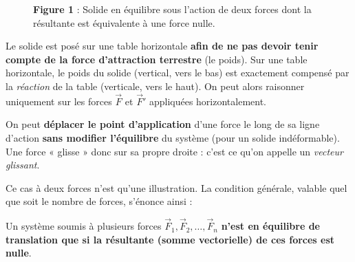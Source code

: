 \documentclass[11pt,a4paper]{article}
\newcommand{\vv}[1]{\vec{#1}}
\begin{document}
\begin{figure}[h]
\centering
{}
\caption*{\small\textbf{\textcolor{primary}{Figure 1}} : Solide en équilibre sous l'action de deux forces
dont la résultante est équivalente à une force nulle.}
\end{figure}

\begin{remarque}
Le solide est posé sur une table horizontale \textbf{afin de ne pas devoir tenir compte de la force
d'attraction terrestre} (le poids). Sur une table horizontale, le poids du solide (vertical, vers le
bas) est exactement compensé par la \emph{réaction} de la table (verticale, vers le haut). On peut
alors raisonner uniquement sur les forces $\vv F$ et $\vv F'$ appliquées horizontalement.
\end{remarque}

\begin{theoreme}
On peut \textbf{déplacer le point d'application} d'une force le long de sa ligne d'action
\textbf{sans modifier l'équilibre} du système (pour un solide indéformable). Une force « glisse »
donc sur sa propre droite : c'est ce qu'on appelle un \emph{vecteur glissant}.
\end{theoreme}

Ce cas à deux forces n'est qu'une illustration. La condition générale, valable quel que soit le
nombre de forces, s'énonce ainsi :

\begin{theoreme}
Un système soumis à plusieurs forces $\vv F_1, \vv F_2, \dots, \vv F_n$ \textbf{n'est en équilibre de
translation que si la résultante (somme vectorielle) de ces forces est nulle}.
\end{theoreme}
\end{document}
